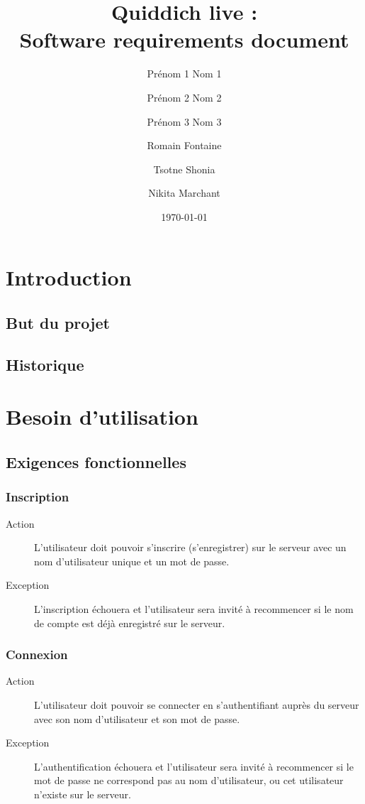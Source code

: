 \documentclass[a4paper]{article}
\title{Quiddich live : \\Software requirements document}
\author{Prénom 1 Nom 1 \and Prénom 2 Nom 2 \and Prénom 3 Nom 3 \and
Romain Fontaine \and Tsotne Shonia \and Nikita Marchant}
\date{\today}
\begin{document}
\maketitle

\section{Introduction}
\subsection{But du projet}

\printglossary[numberedsection]
\subsection{Historique}

\section{Besoin d'utilisation}
\subsection{Exigences fonctionnelles}

\subsubsection{Inscription}
\begin{description}
\item[Action] L'utilisateur doit pouvoir s'inscrire (s'enregistrer) sur le serveur avec un nom d'utilisateur unique et un mot de passe.
\item[Exception] L'inscription échouera et l'utilisateur sera invité à recommencer si le nom de compte est déjà enregistré sur le serveur.
\end{description}

\subsubsection{Connexion}
\begin{description}
\item[Action] L'utilisateur doit pouvoir se connecter en s'authentifiant auprès du serveur avec son nom d'utilisateur et son mot de passe.
\item[Exception] L'authentification échouera et l'utilisateur sera invité à recommencer si le mot de passe ne correspond pas au nom d'utilisateur, ou cet utilisateur n'existe sur le serveur.
\end{description}
\end{document}
